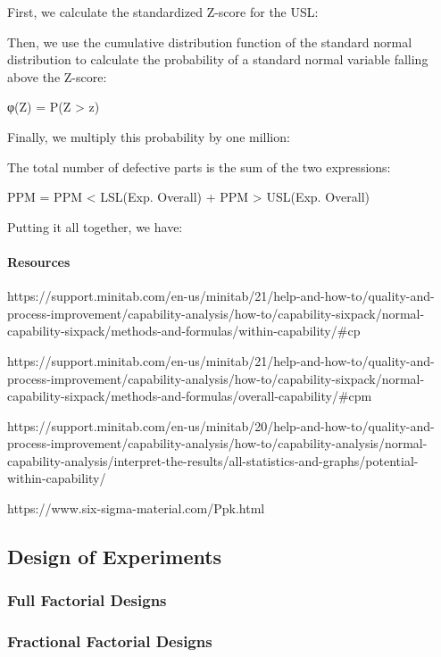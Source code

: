 \documentclass[11pt]{article}
\begin{document}
First, we calculate the standardized Z-score for the USL:

Then, we use the cumulative distribution function of the standard normal
distribution to calculate the probability of a standard normal variable
falling above the Z-score:

φ(Z) = P(Z \textgreater{} z)

Finally, we multiply this probability by one million:

The total number of defective parts is the sum of the two expressions:

PPM = PPM \textless{} LSL(Exp. Overall) + PPM \textgreater{} USL(Exp.
Overall)

Putting it all together, we have:

\hypertarget{resources}{%
\paragraph{Resources}\label{resources}}

https://support.minitab.com/en-us/minitab/21/help-and-how-to/quality-and-process-improvement/capability-analysis/how-to/capability-sixpack/normal-capability-sixpack/methods-and-formulas/within-capability/\#cp

https://support.minitab.com/en-us/minitab/21/help-and-how-to/quality-and-process-improvement/capability-analysis/how-to/capability-sixpack/normal-capability-sixpack/methods-and-formulas/overall-capability/\#cpm

https://support.minitab.com/en-us/minitab/20/help-and-how-to/quality-and-process-improvement/capability-analysis/how-to/capability-analysis/normal-capability-analysis/interpret-the-results/all-statistics-and-graphs/potential-within-capability/

https://www.six-sigma-material.com/Ppk.html

    

    \hypertarget{design-of-experiments}{%
\subsection{Design of Experiments}\label{design-of-experiments}}

\hypertarget{full-factorial-designs}{%
\subsubsection{Full Factorial Designs}\label{full-factorial-designs}}

\hypertarget{fractional-factorial-designs}{%
\subsubsection{Fractional Factorial
Designs}\label{fractional-factorial-designs}}
\end{document}
